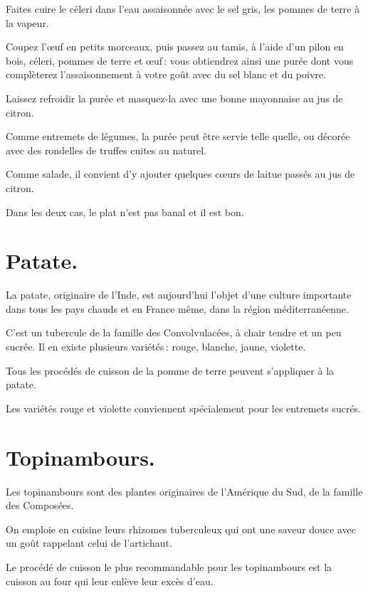 Faites cuire le céleri dans l'eau assaisonnée avec le sel gris, les pommes de
terre à la vapeur.

Coupez l'œuf en petits morceaux, puis passez au tamis, à l'aide d'un pilon en
bois, céleri, pommes de terre et œuf : vous obtiendrez ainsi une purée dont
vous complèterez l’assaisonnement à votre goût avec du sel blanc et du poivre.

Laissez refroidir la purée et masquez-la avec une bonne mayonnaise au jus de
citron.

\medskip

Comme entremets de légumes, la purée peut être servie telle quelle, ou décorée
avec des rondelles de truffes cuites au naturel.

Comme salade, il convient d'y ajouter quelques cœurs de laitue passés au jus de
citron.

Dans les deux cas, le plat n'est pas banal et il est bon.

\section*{\centering Patate.}
{}

La patate, originaire de l'Inde, est aujourd'hui l'objet d'une culture
importante dans tous les pays chauds et en France même, dans la région
méditerranéenne.

C'est un tubercule de la famille des Convolvulacées, à chair tendre et un peu
sucrée. Il en existe plusieurs variétés : rouge, blanche, jaune, violette.

Tous les procédés de cuisson de la pomme de terre peuvent s'appliquer à la
patate.

Les variétés rouge et violette conviennent spécialement pour les entremets
sucrés.

\section*{\centering Topinambours.}
{}

Les topinambours sont des plantes originaires de l'Amérique du Sud, de la
famille des Composées.

On emploie en cuisine leurs rhizomes tuberculeux qui ont une saveur douce
avec un goût rappelant celui de l'artichaut.

Le procédé de cuisson le plus recommandable pour les topinambours est la
cuisson au four qui leur enlève leur excès d’eau.

